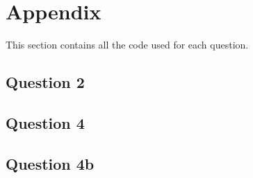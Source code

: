 \documentclass[10pt]{article}
\begin{document}
\section{Appendix}
This section contains all the code used for each question. 

\subsection{Question 2}


\subsection{Question 4}


\subsection{Question 4b}

\end{document}
